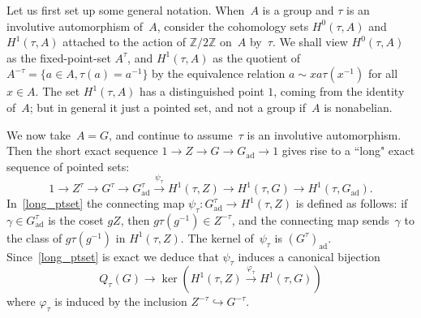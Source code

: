 \documentclass[10pt,leqno]{article}
\newcommand{\ad}{\mathrm{ad}}
\newcommand{\Gad}{G_\mathrm{ad}}
\newcommand{\Z}{\mathbb Z}
\begin{document}
Let us first set up some general notation. When~$A$ is a group and $\tau$ is an involutive automorphism of~$A$, consider the cohomology sets $H^0(\tau, A)$ and $H^1(\tau, A)$ attached to the action of $\Z/2\Z$ on~$A$ by~$\tau$. We shall view   $H^0(\tau, A)$ as the fixed-point-set $A^{\tau}$, and $H^1(\tau,A)$ as the quotient of $A^{-\tau} = \{ a \in A, \tau(a)=a^{-1}\}$ by the equivalence relation $a \sim x a \tau(x^{-1})$ for all $x \in A$. The set $H^1(\tau, A)$ has a distinguished point $1$, coming from the identity of~$A$; but in general it just a pointed set, and not a group if~$A$ is nonabelian. 


We now take~$A=G$, and continue to assume~$\tau$ is an involutive automorphism. Then the short exact sequence $1\rightarrow Z \rightarrow G \rightarrow \Gad\rightarrow 1$ 
gives rise to a ``long" exact sequence of pointed sets:
\begin{equation} \label{long_ptset}
1\rightarrow Z^\tau \rightarrow G^\tau \rightarrow \Gad^{\tau} \overset{\psi_\tau}{\longrightarrow} H^1(\tau,Z)\to H^1(\tau,G)\rightarrow H^1(\tau,\Gad).
\end{equation}
In~\eqref{long_ptset} the connecting map  $ \psi_\tau\colon \Gad^{\tau} \rightarrow H^1(\tau,Z)$ is defined as follows: if $\gamma \in \Gad^{\tau}$ is the coset $gZ$, then $g\tau(g^{-1}) \in Z^{-\tau}$, and the connecting map sends~$\gamma$ to the class of $g \tau(g^{-1})$ in $H^1(\tau, Z)$. The kernel of~$\psi_\tau$ is $(G^\tau)_{\ad}$. Since~\eqref{long_ptset} is exact we deduce that $\psi_\tau$ induces a canonical  bijection
\begin{equation} \label{interp_q_cohomology} Q_{\tau}(G) \to  \ker\left(H^1(\tau,Z)\overset{\varphi_\tau}{\longrightarrow} H^1(\tau,G)\right)\end{equation}
where $\varphi_\tau$ is induced by the inclusion $Z^{-\tau} \hookrightarrow G^{-\tau}$. 


 
\end{document}
